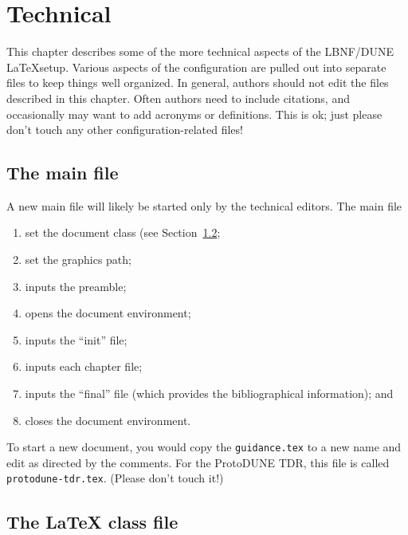 \chapter{Technical}

This chapter describes some of the more technical aspects of the LBNF/DUNE \LaTeX setup. Various aspects of the configuration are pulled out into separate files to keep things well organized.  In general, authors should 
not edit the files described in this chapter. Often authors need to include citations, and occasionally may want to add acronyms or definitions. This is ok; just please don't touch any other configuration-related files!

\section{The main file}
\label{sec:mainfile}

A new main file will likely be started only by the technical editors. The main file

\begin{enumerate}
\item set the document class (see Section~\ref{sec:classfile};
\item set the graphics path;
\item inputs the preamble;
\item opens the document environment;
\item inputs the ``init'' file;
\item inputs each chapter file;
\item inputs the ``final'' file (which provides the bibliographical information); and
\item closes the document environment.
\end{enumerate}

To start a new document, you would copy the \texttt{guidance.tex} to a new
name and edit as directed by the comments.  For the ProtoDUNE TDR, this file is called \texttt{protodune-tdr.tex}. (Please don't touch it!) 



\section{The \LaTeX{} class file}
\label{sec:classfile}

